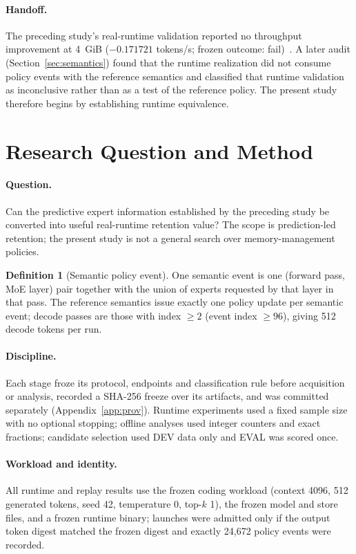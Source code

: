 \documentclass[11pt]{article}
\theoremstyle{plain}
\theoremstyle{definition}
\newtheorem{definition}{Definition}
\begin{document}
\paragraph{Handoff.} The preceding study's real-runtime validation reported no throughput improvement at 4~GiB ($-0.171721$ tokens/s; frozen outcome: fail)~\cite{argine2paper}. A later audit (Section~\ref{sec:semantics}) found that the runtime realization did not consume policy events with the reference semantics and classified that runtime validation as inconclusive rather than as a test of the reference policy. The present study therefore begins by establishing runtime equivalence.

\section{Research Question and Method}
\label{sec:method}

\paragraph{Question.} Can the predictive expert information established by the preceding study be converted into useful real-runtime retention value? The scope is prediction-led retention; the present study is not a general search over memory-management policies.

\begin{definition}[Semantic policy event]
One semantic event is one (forward pass, MoE layer) pair together with the union of experts requested by that layer in that pass. The reference semantics issue exactly one policy update per semantic event; decode passes are those with index $\ge 2$ (event index $\ge 96$), giving 512 decode tokens per run.
\end{definition}

\paragraph{Discipline.} Each stage froze its protocol, endpoints and classification rule before acquisition or analysis, recorded a SHA-256 freeze over its artifacts, and was committed separately (Appendix~\ref{app:prov}). Runtime experiments used a fixed sample size with no optional stopping; offline analyses used integer counters and exact fractions; candidate selection used DEV data only and EVAL was scored once.

\paragraph{Workload and identity.} All runtime and replay results use the frozen coding workload (context 4096, 512 generated tokens, seed 42, temperature 0, top-$k$ 1), the frozen model and store files, and a frozen runtime binary; launches were admitted only if the output token digest matched the frozen digest and exactly 24{,}672 policy events were recorded.
\end{document}
